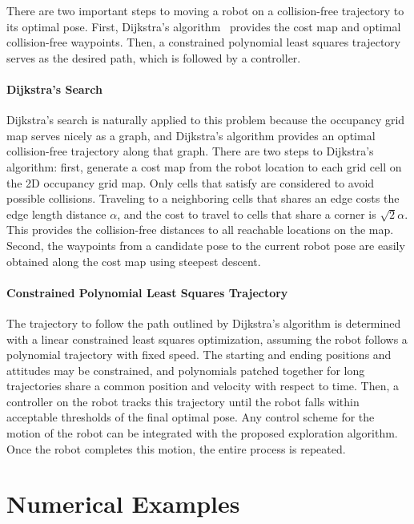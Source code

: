 There are two important steps to moving a robot on a collision-free trajectory to its optimal pose. First, Dijkstra's algorithm~\cite{Dij59} provides the cost map and optimal collision-free waypoints. Then, a constrained polynomial least squares trajectory serves as the desired path, which is followed by a controller.

\paragraph{Dijkstra's Search}

Dijkstra's search is naturally applied to this problem because the occupancy grid map serves nicely as a graph, and Dijkstra's algorithm provides an optimal collision-free trajectory along that graph. There are two steps to Dijkstra's algorithm: first, generate a cost map from the robot location to each grid cell on the 2D occupancy grid map. Only cells that satisfy  are considered to avoid possible collisions. Traveling to a neighboring cells that shares an edge costs the edge length distance $\alpha$, and the cost to travel to cells that share a corner is $\sqrt{2}\alpha$. This provides the collision-free distances to all reachable locations on the map. Second, the waypoints from a candidate pose to the current robot pose are easily obtained along the cost map using steepest descent. 


\paragraph{Constrained Polynomial Least Squares Trajectory} The trajectory to follow the path outlined by Dijkstra's algorithm is determined with a linear constrained least squares optimization, assuming the robot follows a polynomial trajectory with fixed speed. The starting and ending positions and attitudes may be constrained, and polynomials patched together for long trajectories share a common position and velocity with respect to time. Then, a controller on the robot tracks this trajectory until the robot falls within acceptable thresholds of the final optimal pose. Any control scheme for the motion of the robot can be integrated with the proposed exploration algorithm. Once the robot completes this motion, the entire process is repeated. 

\section{Numerical Examples}
\label{sec:Ae2DNumExamples}

